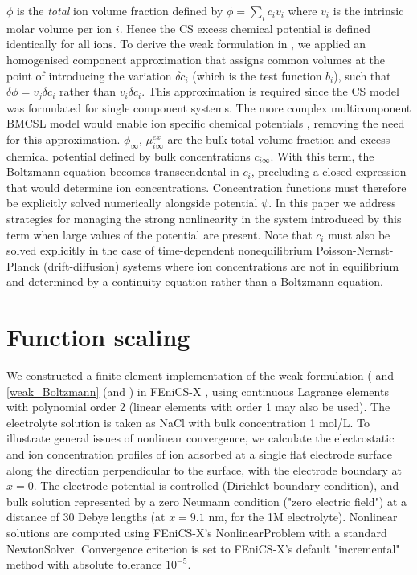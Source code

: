 $\phi$ is the \emph{total} ion volume fraction defined by
$\phi=\sum_i c_i v_i$ where $v_i$ is the intrinsic molar volume per
ion $i$. Hence the CS excess chemical potential is defined identically
for all ions. To derive the weak formulation in , we
applied an homogenised component approximation that assigns common
volumes at the point of introducing the variation  $\delta c_i$ (which
is the test function $b_i$), such that $\delta\phi=v_j \delta c_i$ rather
than $v_i \delta c_i$. This approximation is required since the CS
model was formulated for single component systems. The more complex
multicomponent BMCSL model would enable ion specific chemical
potentials \cite{MansooriCarnahanStarlingLeland1971}, removing the
need for this approximation.  $\phi_{\infty}$, $\mu_{i\infty}^{ex}$
are the bulk total volume fraction and excess chemical potential
defined by bulk concentrations $c_{i\infty}$. With this term, the
Boltzmann equation  becomes transcendental in $c_i$, precluding a closed
expression that would determine ion concentrations. Concentration functions must therefore be
explicitly solved  numerically alongside potential $\psi$. In this
paper we address strategies for managing the strong nonlinearity in
the system introduced by this term when large values of the
potential are present. Note that $c_i$ must also be solved explicitly in the case
of time-dependent nonequilibrium Poisson-Nernst-Planck (drift-diffusion) systems \cite{LopezGarciaHornoGrosse2018} where
ion concentrations are not in equilibrium and determined by a
continuity equation rather than a Boltzmann equation.

\section{Function scaling}
We constructed a finite element implementation of the weak
formulation ( and \ref{weak_Boltzmann} (and
) in FEniCS-X \cite{baratta2023dolfinx}, using continuous
Lagrange elements with polynomial order 2 (linear elements with order
1 may also be used).  The electrolyte solution
is taken as NaCl with bulk concentration 1 mol/L.  To illustrate
general issues of nonlinear convergence, we calculate the
electrostatic and ion concentration profiles of ion adsorbed at a
single flat electrode surface along the direction perpendicular to the
surface, with the electrode boundary at $x=0$.  The electrode
potential is controlled (Dirichlet boundary condition), and bulk
solution represented by a zero Neumann condition ("zero electric
field") at a distance of 30 Debye lengths (at $x=9.1$ nm, for the 1M
electrolyte). Nonlinear solutions are computed using FEniCS-X's
NonlinearProblem with a standard NewtonSolver. Convergence criterion
is set to FEniCS-X's default "incremental" method with absolute
tolerance $10^{-5}$.

